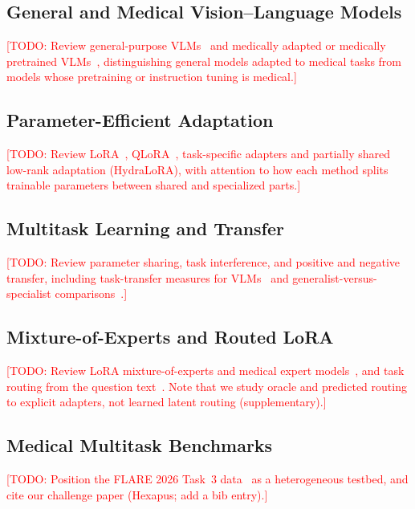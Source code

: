 \documentclass[journal,twoside,web]{ieeecolor}
\newcommand{\todo}[1]{\textcolor{red}{[TODO: #1]}}
\begin{document}
\subsection{General and Medical Vision--Language Models}

\todo{Review general-purpose VLMs~\cite{li2023blip2,bai2025qwen25vl,
zhu2025internvl3,qwen2026qwen35} and medically adapted or medically
pretrained VLMs~\cite{li2023llavamed,chen2024huatuogptvision,
sellergren2025medgemma}, distinguishing general models adapted to medical
tasks from models whose pretraining or instruction tuning is medical.}

\subsection{Parameter-Efficient Adaptation}

\todo{Review LoRA~\cite{hu2022lora}, QLoRA~\cite{dettmers2023qlora},
task-specific adapters and partially shared low-rank adaptation (HydraLoRA),
with attention to how each method splits trainable parameters between shared
and specialized parts.}

\subsection{Multitask Learning and Transfer}

\todo{Review parameter sharing, task interference, and positive and negative
transfer, including task-transfer measures for VLMs~\cite{sachdeva2026tasktransfer}
and generalist-versus-specialist comparisons~\cite{zhong2025generalist,
sun2025multitask}.}

\subsection{Mixture-of-Experts and Routed LoRA}

\todo{Review LoRA mixture-of-experts and medical expert
models~\cite{jiang2024medmoe}, and task routing from the question
text~\cite{stepanov2025gliclass}. Note that we study oracle and predicted
routing to explicit adapters, not learned latent routing (supplementary).}

\subsection{Medical Multitask Benchmarks}

\todo{Position the FLARE 2026 Task~3 data~\cite{flare2026task3,ma2025flare}
as a heterogeneous testbed, and cite our challenge paper (Hexapus; add a
bib entry).}
\end{document}
